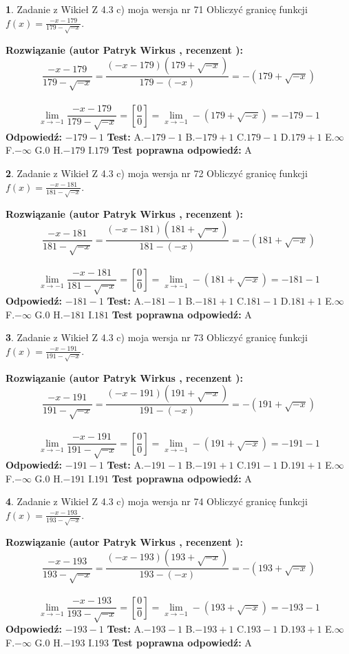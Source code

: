 \documentclass[12pt, a4paper]{article}
\theoremstyle{definition} %
\newtheorem{zad}{}
\newcommand{\zadStart}[1]{\begin{zad}#1\newline}
\newcommand{\zadStop}{\end{zad}}
\newcommand{\rozwStart}[2]{\noindent \textbf{Rozwiązanie (autor #1 , recenzent #2): }\newline}
\newcommand{\rozwStop}{\newline}
\newcommand{\odpStart}{\noindent \textbf{Odpowiedź:}\newline}
\newcommand{\odpStop}{\newline}
\newcommand{\testStart}{\noindent \textbf{Test:}\newline}
\newcommand{\testStop}{\newline}
\newcommand{\kluczStart}{\noindent \textbf{Test poprawna odpowiedź:}\newline}
\newcommand{\kluczStop}{\newline}
\begin{document}
\zadStart{Zadanie z Wikieł Z 4.3 c) moja wersja nr 71}
Obliczyć granicę funkcji $f(x)=\frac{-x-179}{179-\sqrt{-x}}$.
\zadStop
\rozwStart{Patryk Wirkus}{}
$$\frac{-x-179}{179-\sqrt{-x}}=\frac{(-x-179)(179+\sqrt{-x})}{179-(-x)}=-(179+\sqrt{-x})$$
\\
$$\lim\limits_{x\to-1}\frac{-x-179}{179-\sqrt{-x}}=[\frac{0}{0}]=\lim\limits_{x\to-1}-(179+\sqrt{-x}) =-179-1$$
\rozwStop
\odpStart
$-179-1$
\odpStop
\testStart
A.$-179-1$
B.$-179+1$
C.$179-1$
D.$179+1$
E.$\infty$
F.$-\infty$
G.$0$
H.$-179$
I.$179$
\testStop
\kluczStart
A
\kluczStop



\zadStart{Zadanie z Wikieł Z 4.3 c) moja wersja nr 72}
Obliczyć granicę funkcji $f(x)=\frac{-x-181}{181-\sqrt{-x}}$.
\zadStop
\rozwStart{Patryk Wirkus}{}
$$\frac{-x-181}{181-\sqrt{-x}}=\frac{(-x-181)(181+\sqrt{-x})}{181-(-x)}=-(181+\sqrt{-x})$$
\\
$$\lim\limits_{x\to-1}\frac{-x-181}{181-\sqrt{-x}}=[\frac{0}{0}]=\lim\limits_{x\to-1}-(181+\sqrt{-x}) =-181-1$$
\rozwStop
\odpStart
$-181-1$
\odpStop
\testStart
A.$-181-1$
B.$-181+1$
C.$181-1$
D.$181+1$
E.$\infty$
F.$-\infty$
G.$0$
H.$-181$
I.$181$
\testStop
\kluczStart
A
\kluczStop



\zadStart{Zadanie z Wikieł Z 4.3 c) moja wersja nr 73}
Obliczyć granicę funkcji $f(x)=\frac{-x-191}{191-\sqrt{-x}}$.
\zadStop
\rozwStart{Patryk Wirkus}{}
$$\frac{-x-191}{191-\sqrt{-x}}=\frac{(-x-191)(191+\sqrt{-x})}{191-(-x)}=-(191+\sqrt{-x})$$
\\
$$\lim\limits_{x\to-1}\frac{-x-191}{191-\sqrt{-x}}=[\frac{0}{0}]=\lim\limits_{x\to-1}-(191+\sqrt{-x}) =-191-1$$
\rozwStop
\odpStart
$-191-1$
\odpStop
\testStart
A.$-191-1$
B.$-191+1$
C.$191-1$
D.$191+1$
E.$\infty$
F.$-\infty$
G.$0$
H.$-191$
I.$191$
\testStop
\kluczStart
A
\kluczStop



\zadStart{Zadanie z Wikieł Z 4.3 c) moja wersja nr 74}
Obliczyć granicę funkcji $f(x)=\frac{-x-193}{193-\sqrt{-x}}$.
\zadStop
\rozwStart{Patryk Wirkus}{}
$$\frac{-x-193}{193-\sqrt{-x}}=\frac{(-x-193)(193+\sqrt{-x})}{193-(-x)}=-(193+\sqrt{-x})$$
\\
$$\lim\limits_{x\to-1}\frac{-x-193}{193-\sqrt{-x}}=[\frac{0}{0}]=\lim\limits_{x\to-1}-(193+\sqrt{-x}) =-193-1$$
\rozwStop
\odpStart
$-193-1$
\odpStop
\testStart
A.$-193-1$
B.$-193+1$
C.$193-1$
D.$193+1$
E.$\infty$
F.$-\infty$
G.$0$
H.$-193$
I.$193$
\testStop
\kluczStart
A
\kluczStop
\end{document}
